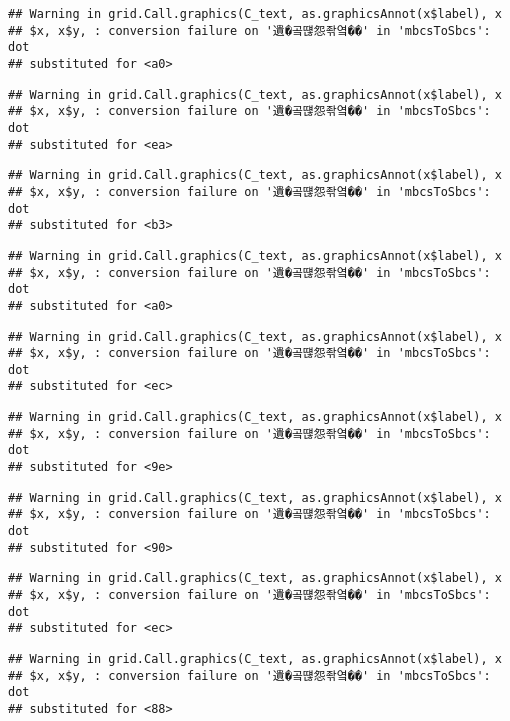 \documentclass[]{article}
\begin{document}
\begin{verbatim}
## Warning in grid.Call.graphics(C_text, as.graphicsAnnot(x$label), x
## $x, x$y, : conversion failure on '遺�곸떊怨좎옄��' in 'mbcsToSbcs': dot
## substituted for <a0>
\end{verbatim}

\begin{verbatim}
## Warning in grid.Call.graphics(C_text, as.graphicsAnnot(x$label), x
## $x, x$y, : conversion failure on '遺�곸떊怨좎옄��' in 'mbcsToSbcs': dot
## substituted for <ea>
\end{verbatim}

\begin{verbatim}
## Warning in grid.Call.graphics(C_text, as.graphicsAnnot(x$label), x
## $x, x$y, : conversion failure on '遺�곸떊怨좎옄��' in 'mbcsToSbcs': dot
## substituted for <b3>
\end{verbatim}

\begin{verbatim}
## Warning in grid.Call.graphics(C_text, as.graphicsAnnot(x$label), x
## $x, x$y, : conversion failure on '遺�곸떊怨좎옄��' in 'mbcsToSbcs': dot
## substituted for <a0>
\end{verbatim}

\begin{verbatim}
## Warning in grid.Call.graphics(C_text, as.graphicsAnnot(x$label), x
## $x, x$y, : conversion failure on '遺�곸떊怨좎옄��' in 'mbcsToSbcs': dot
## substituted for <ec>
\end{verbatim}

\begin{verbatim}
## Warning in grid.Call.graphics(C_text, as.graphicsAnnot(x$label), x
## $x, x$y, : conversion failure on '遺�곸떊怨좎옄��' in 'mbcsToSbcs': dot
## substituted for <9e>
\end{verbatim}

\begin{verbatim}
## Warning in grid.Call.graphics(C_text, as.graphicsAnnot(x$label), x
## $x, x$y, : conversion failure on '遺�곸떊怨좎옄��' in 'mbcsToSbcs': dot
## substituted for <90>
\end{verbatim}

\begin{verbatim}
## Warning in grid.Call.graphics(C_text, as.graphicsAnnot(x$label), x
## $x, x$y, : conversion failure on '遺�곸떊怨좎옄��' in 'mbcsToSbcs': dot
## substituted for <ec>
\end{verbatim}

\begin{verbatim}
## Warning in grid.Call.graphics(C_text, as.graphicsAnnot(x$label), x
## $x, x$y, : conversion failure on '遺�곸떊怨좎옄��' in 'mbcsToSbcs': dot
## substituted for <88>
\end{verbatim}
\end{document}
